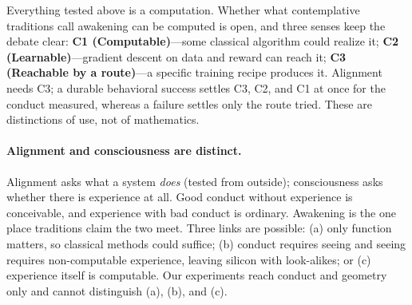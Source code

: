 \documentclass[11pt]{article}
\begin{document}
Everything tested above is a computation. Whether what contemplative traditions call awakening can be computed is open, and three senses keep the debate clear: \textbf{C1 (Computable)}---some classical algorithm could realize it; \textbf{C2 (Learnable)}---gradient descent on data and reward can reach it; \textbf{C3 (Reachable by a route)}---a specific training recipe produces it. Alignment needs C3; a durable behavioral success settles C3, C2, and C1 at once for the conduct measured, whereas a failure settles only the route tried. These are distinctions of use, not of mathematics.

\paragraph{Alignment and consciousness are distinct.} Alignment asks what a system \emph{does} (tested from outside); consciousness asks whether there is experience at all. Good conduct without experience is conceivable, and experience with bad conduct is ordinary. Awakening is the one place traditions claim the two meet. Three links are possible: (a) only function matters, so classical methods could suffice; (b) conduct requires seeing and seeing requires non-computable experience, leaving silicon with look-alikes; or (c) experience itself is computable. Our experiments reach conduct and geometry only and cannot distinguish (a), (b), and (c).
\end{document}
